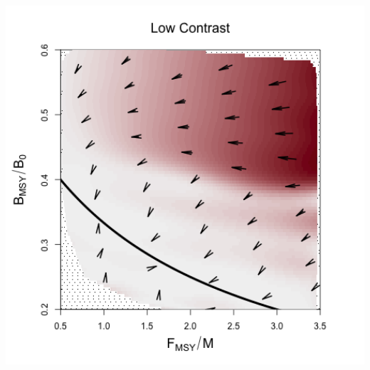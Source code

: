 \documentclass[ xcolor = pdftex, dvipsnames, table ]{beamer}
\begin{document}
\begin{frame}
\end{frame}

\begin{frame}
\begin{minipage}[h!]{0.49\textwidth}
        \includegraphics[width=1\textwidth]{../../gpBias/directionalBiasSchnuteSubHHardFlatT30N150WWideN112.png}
\end{minipage}
\begin{minipage}[h!]{0.49\textwidth}

\end{minipage}
\end{frame}
\end{document}
